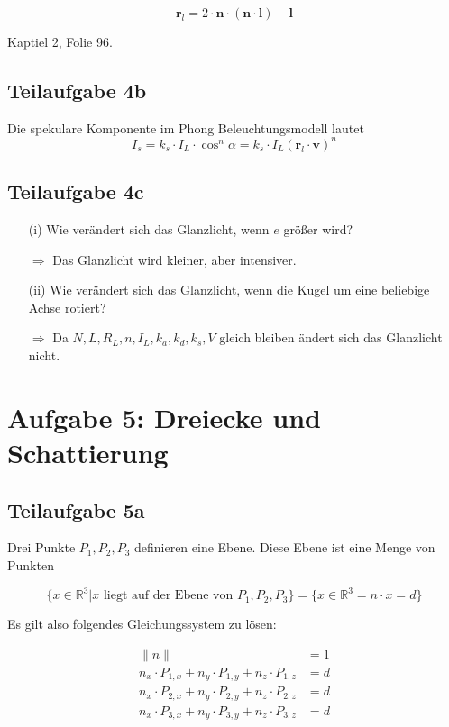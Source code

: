 \documentclass[a4paper]{scrartcl}
\begin{document}
\[\mathbf{r}_l = 2 \cdot \mathbf{n} \cdot (\mathbf{n} \cdot \mathbf{l}) - \mathbf{l}\]

Kaptiel 2, Folie 96.


\subsection*{Teilaufgabe 4b}
Die spekulare Komponente im Phong Beleuchtungsmodell lautet
\[I_s = k_s \cdot I_L \cdot \cos^n \alpha = k_s \cdot I_L (\mathbf{r}_l \cdot \mathbf{v})^n\]

\subsection*{Teilaufgabe 4c}
\begin{enumerate}
    \item[(i)] Wie verändert sich das Glanzlicht, wenn $e$ größer wird?
    \item[$\Rightarrow$] Das Glanzlicht wird kleiner, aber intensiver.
    \item[(ii)] Wie verändert sich das Glanzlicht, wenn die Kugel um eine beliebige Achse rotiert?
    \item[$\Rightarrow$] Da $N,L, R_L, n, I_L, k_a, k_d, k_s, V$ gleich bleiben ändert sich das Glanzlicht nicht.
\end{enumerate}


\section*{Aufgabe 5: Dreiecke und Schattierung}
\subsection*{Teilaufgabe 5a}
Drei Punkte $P_1, P_2, P_3$ definieren eine Ebene. Diese Ebene ist eine Menge
von Punkten

\[\{x \in \mathbb{R}^3 | x \text{ liegt auf der Ebene von } P_1, P_2, P_3\} = \{x \in \mathbb{R}^3 = n \cdot x = d\}\]

Es gilt also folgendes Gleichungssystem zu lösen:

\begin{align}
    \|n\| &= 1\\
    n_x \cdot P_{1, x} + n_y \cdot P_{1, y} + n_z \cdot P_{1, z} &= d\\
    n_x \cdot P_{2, x} + n_y \cdot P_{2, y} + n_z \cdot P_{2, z} &= d\\
    n_x \cdot P_{3, x} + n_y \cdot P_{3, y} + n_z \cdot P_{3, z} &= d
\end{align}
\end{document}

